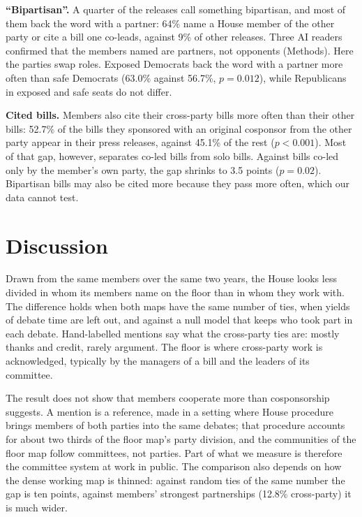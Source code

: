 \documentclass[9pt,twocolumn,twoside]{pnas-new}
\begin{document}
\textbf{``Bipartisan''.} A quarter of the releases call something bipartisan, and most of them back the word with a
partner: 64\% name a House member of the other party or cite a bill one co-leads, against 9\% of other releases.
Three AI readers confirmed that the members named are partners, not opponents (Methods). Here the parties swap roles.
Exposed Democrats back the word with a partner more often than safe Democrats (63.0\% against 56.7\%, $p = 0.012$),
while Republicans in exposed and safe seats do not differ.

\textbf{Cited bills.} Members also cite their cross-party bills more often than their other bills: 52.7\% of the
bills they sponsored with an original cosponsor from the other party appear in their press releases, against 45.1\%
of the rest ($p < 0.001$). Most of that gap, however, separates co-led bills from solo bills. Against bills co-led
only by the member's own party, the gap shrinks to 3.5 points ($p = 0.02$). Bipartisan bills may also be cited more
because they pass more often, which our data cannot test.

\section*{Discussion}

Drawn from the same members over the same two years, the House looks less divided in whom its members name on the
floor than in whom they work with. The difference holds when both maps have the same number of ties, when yields
of debate time are left out, and against a null model that keeps who took part in each debate. Hand-labelled
mentions say what the cross-party ties are: mostly thanks and credit, rarely argument. The floor is where
cross-party work is acknowledged, typically by the managers of a bill and the leaders of its committee.

The result does not show that members cooperate more than cosponsorship suggests. A mention is a reference, made
in a setting where House procedure brings members of both parties into the same debates; that procedure accounts
for about two thirds of the floor map's party division, and the communities of the floor map follow committees,
not parties. Part of what we measure is therefore the committee system at work in public. The comparison also
depends on how the dense working map is thinned: against random ties of the same number the gap is ten points,
against members' strongest partnerships (12.8\% cross-party) it is much wider.
\end{document}
